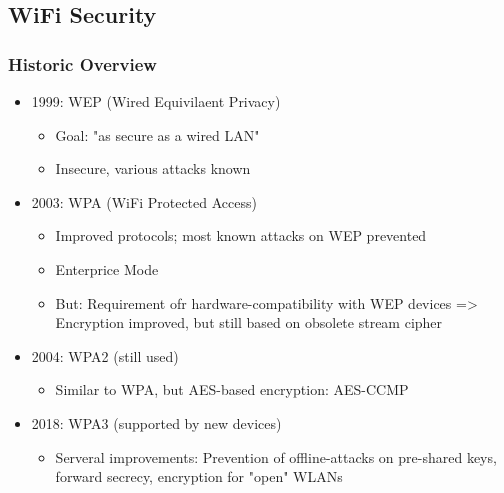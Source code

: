 \subsection{WiFi Security}
\subsubsection{Historic Overview}
\begin{itemize}
  \item 1999: WEP (Wired Equivilaent Privacy)
    \begin{itemize}
      \item Goal: "as secure as a wired LAN"
      \item Insecure, various attacks known
    \end{itemize}
  \item 2003: WPA (WiFi Protected Access)
    \begin{itemize}
      \item Improved protocols; most known attacks on WEP prevented
      \item Enterprice Mode
      \item But: Requirement ofr hardware-compatibility with WEP devices => Encryption improved, but still based on obsolete stream cipher
    \end{itemize}
  \item 2004: WPA2 (still used) 
    \begin{itemize}
      \item Similar to WPA, but AES-based encryption: AES-CCMP
    \end{itemize}
  \item 2018: WPA3 (supported by new devices) 
    \begin{itemize}
      \item Serveral improvements: 
        Prevention of offline-attacks on pre-shared keys, forward secrecy, encryption for "open" WLANs
    \end{itemize}
\end{itemize}

